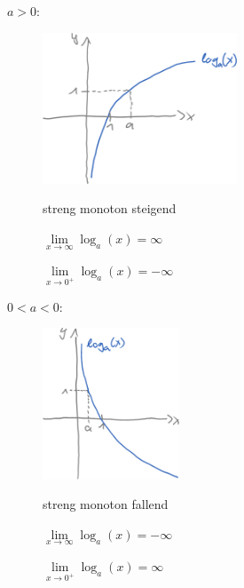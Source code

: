 \ul{$a>0$}:
\begin{figure}[h!]
	\begin{minipage}{0.48\linewidth}
		\centering\includegraphics[height=4.5cm]{Bilder/191}
		\caption{}
	\end{minipage}
	\begin{minipage}{0.30\linewidth}
		streng monoton steigend
		
		$\lim\limits_{x\to\infty}\log_a(x)=\infty$
		
		$\lim\limits_{x\to0^+}\log_a(x)=-\infty$
	\end{minipage}
\end{figure}

\ul{$0<a<0$}:
\begin{figure}[h!]
	\begin{minipage}{0.48\linewidth}
		\centering\includegraphics[height=4.5cm]{Bilder/192}
		\caption{}
	\end{minipage}
	\begin{minipage}{0.30\linewidth}
		streng monoton fallend
		
		$\lim\limits_{x\to\infty}\log_a(x)=-\infty$
		
		$\lim\limits_{x\to0^+}\log_a(x)=\infty$
	\end{minipage}
\end{figure}


